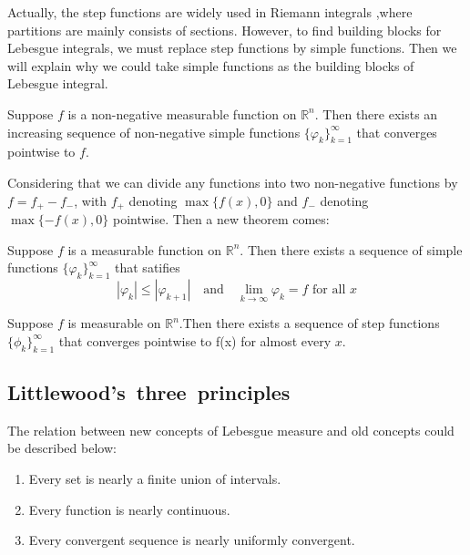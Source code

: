 \documentclass{ctexbook}
\begin{document}
Actually, the step functions are widely used in Riemann integrals ,where partitions are mainly consists of sections. However,
to find building blocks for Lebesgue integrals, we must replace step functions by simple functions. Then we will explain why we could
take simple functions as the building blocks of Lebesgue integral.

\begin{thm}
    Suppose $f$ is a non-negative measurable function on $\mathbb{R}^n$. Then there exists an increasing sequence of non-negative
    simple functions $\{\varphi_k\}_{k=1}^\infty$ that converges pointwise to $f$.
\end{thm}

Considering that we can divide any functions into two non-negative functions by $f = f_+ - f_-$, with $f_+$ denoting $\max\{f(x), 0\}$
and $f_-$ denoting $\max\{-f(x), 0\}$ pointwise. Then a new theorem comes:

\begin{thm}
    Suppose $f$ is a measurable function on $\mathbb{R}^n$. Then there exists a sequence of simple functions $\{\varphi_k\}_{k=1}^\infty$
    that satifies \[\left\lvert \varphi_k\right\rvert \leq \left\lvert  \varphi_{k+1}\right\rvert \quad \text{and} \quad \lim\limits_{k \rightarrow \infty}
    \varphi_k = f \text{ for all }x  \]
\end{thm}

\begin{thm}
    Suppose $f$ is measurable on $\mathbb{R}^n$.Then there exists a sequence of step functions $\{\phi_k\}_{k=1}^\infty$
    that converges pointwise to f(x) for almost every $x$.
\end{thm}

\subsection*{Littlewood's~three~principles}

\begin{fact}
    The relation between new concepts of Lebesgue measure and old concepts could be described below:
    \begin{enumerate}
        \item Every set is nearly a finite union of intervals.
        \item Every function is nearly continuous.
        \item Every convergent sequence is nearly uniformly convergent.
    \end{enumerate}
\end{fact}
\end{document}
